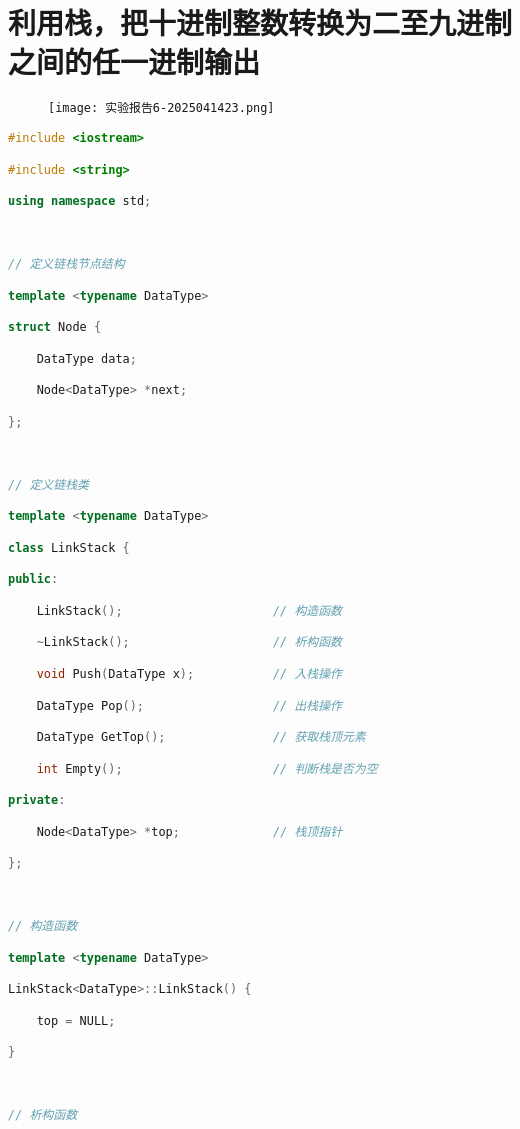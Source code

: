 \section{利用栈，把十进制整数转换为二至九进制之间的任一进制输出}

\begin{figure}[H]
\centering
\texttt{[image: 实验报告6-2025041423.png]}
\label{}
\end{figure}

\begin{lstlisting}[language=C++]
#include <iostream>

#include <string>

using namespace std;

  

// 定义链栈节点结构

template <typename DataType>

struct Node {

    DataType data;

    Node<DataType> *next;

};

  

// 定义链栈类

template <typename DataType>

class LinkStack {

public:

    LinkStack();                     // 构造函数

    ~LinkStack();                    // 析构函数

    void Push(DataType x);           // 入栈操作

    DataType Pop();                  // 出栈操作

    DataType GetTop();               // 获取栈顶元素

    int Empty();                     // 判断栈是否为空

private:

    Node<DataType> *top;             // 栈顶指针

};

  

// 构造函数

template <typename DataType>

LinkStack<DataType>::LinkStack() {

    top = NULL;

}

  

// 析构函数


\end{lstlisting}
